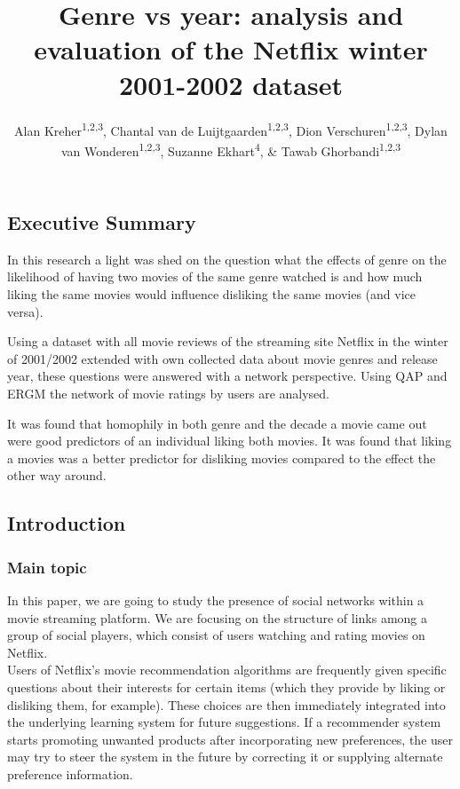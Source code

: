\documentclass[
  english,
  man,floatsintext]{apa6}
\title{Genre vs year: analysis and evaluation of the Netflix winter 2001-2002 dataset}
\author{Alan Kreher\textsuperscript{1,2,3}, Chantal van de Luijtgaarden\textsuperscript{1,2,3}, Dion Verschuren\textsuperscript{1,2,3}, Dylan van Wonderen\textsuperscript{1,2,3}, Suzanne Ekhart\textsuperscript{4}, \& Tawab Ghorbandi\textsuperscript{1,2,3}}
\date{}
\affiliation{\vspace{0.5cm}\textsuperscript{1} Jheronimus Academy of Data Science\\\textsuperscript{2} Eindhoven University of Technology\\\textsuperscript{3} Tilburg University\\\textsuperscript{4} Utrecht University}
\begin{document}
\maketitle

{
\setcounter{tocdepth}{3}
\tableofcontents
}
\hypertarget{executive-summary}{%
\subsection{Executive Summary}\label{executive-summary}}

In this research a light was shed on the question what the effects of genre on the likelihood of having two movies of the same genre watched is and how much liking the same movies would influence disliking the same movies (and vice versa).

Using a dataset with all movie reviews of the streaming site Netflix in the winter of 2001/2002 extended with own collected data about movie genres and release year, these questions were answered with a network perspective. Using QAP and ERGM the network of movie ratings by users are analysed.

It was found that homophily in both genre and the decade a movie came out were good predictors of an individual liking both movies. It was found that liking a movies was a better predictor for disliking movies compared to the effect the other way around.

\hypertarget{introduction}{%
\subsection{Introduction}\label{introduction}}

\hypertarget{main-topic}{%
\subsubsection{Main topic}\label{main-topic}}

In this paper, we are going to study the presence of social networks within a movie streaming platform. We are focusing on the structure of links among a group of social players, which consist of users watching and rating movies on Netflix.\\
Users of Netflix's movie recommendation algorithms are frequently given specific questions about their interests for certain items (which they provide by liking or disliking them, for example). These choices are then immediately integrated into the underlying learning system for future suggestions. If a recommender system starts promoting unwanted products after incorporating new preferences, the user may try to steer the system in the future by correcting it or supplying alternate preference information.
\end{document}
